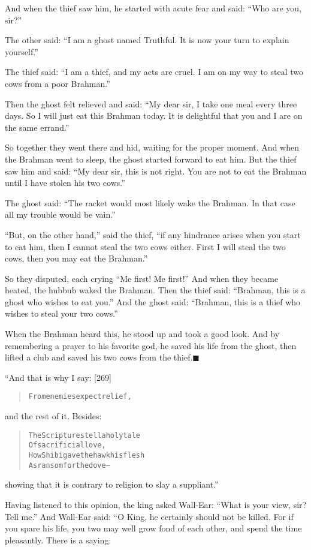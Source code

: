 \documentclass[article, twoside, 14pt]{memoir}
\newcommand{\qed}{\hfill \ensuremath{\blacksquare}}
\renewenvironment{verbatim}{%
\begin{quote}%
\vskip -10pt%
\begin{alltt}\normalfont\large}{\end{alltt}%
\end{quote}%
\vskip -10pt
} %
\begin{document}
And when the thief saw him, he started with acute fear and said:
``Who are you, sir?''

The other said:
``I am a ghost named Truthful. It is now your turn to explain yourself.''

The thief said:
``I am a thief, and my acts are cruel. I am on my way to steal two cows from a poor Brahman.''

Then the ghost felt relieved and said:
``My dear sir, I take one meal every three days. So I will just eat this Brahman today. It is delightful that you and I are on the same errand.''

So together they went there and hid, waiting for the proper moment.
And when the Brahman went to sleep, the ghost started forward to
eat him. But the thief saw him and said:
``My dear sir, this is not right. You are not to eat the Brahman until I have stolen his two cows.''

The ghost said:
``The racket would most likely wake the Brahman. In that case all my trouble would be vain.''

``But, on the other hand,'' said the thief,
``if any hindrance arises when you start to eat him, then I cannot steal the two cows either. First I will steal the two cows, then you may eat the Brahman.''

So they disputed, each crying ``Me first! Me first!'' And when they
became heated, the hubbub waked the Brahman. Then the thief said:
``Brahman, this is a ghost who wishes to eat you.'' And the ghost
said:
``Brahman, this is a thief who wishes to steal your two cows.''

When the Brahman heard this, he stood up and took a good look. And
by remembering a prayer to his favorite god, he saved his life from
the ghost, then lifted a club and saved his two cows from the
thief.\hyperref[s57]{\qed}

“And that is why I say: [269]

\begin{verbatim}
From enemies expect relief,
\end{verbatim}
and the rest of it. Besides:

\begin{verbatim}
The Scriptures tell a holy tale
    Of sacrificial love,
How Shibi gave the hawk his flesh
    As ransom for the dove--
\end{verbatim}
showing that it is contrary to religion to slay a suppliant.”

Having listened to this opinion, the king asked Wall-Ear:
``What is your view, sir? Tell me.'' And Wall-Ear said: “O King, he
certainly should not be killed. For if you spare his life, you two
may well grow fond of each other, and spend the time pleasantly.
There is a saying:
\end{document}
